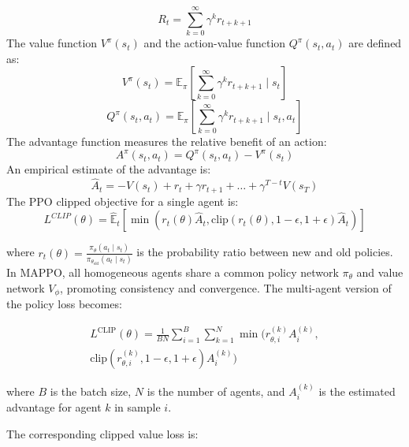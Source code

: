 \documentclass[lettersize,journal]{IEEEtran}
\begin{document}
\begin{equation}
R_t = \sum_{k=0}^{\infty} \gamma^k r_{t+k+1} \tag{10}
\end{equation}
The value function \( V^\pi(s_t) \) and the action-value function \( Q^\pi(s_t, a_t) \) are defined as:
\begin{equation}
V^\pi(s_t) = \mathbb{E}_\pi \left[ \sum_{k=0}^{\infty} \gamma^k r_{t+k+1} \mid s_t \right] \tag{11}
\end{equation}
\begin{equation}
Q^\pi(s_t, a_t) = \mathbb{E}_\pi \left[ \sum_{k=0}^{\infty} \gamma^k r_{t+k+1} \mid s_t, a_t \right] \tag{12}
\end{equation}
The advantage function measures the relative benefit of an action:
\begin{equation}
A^\pi(s_t, a_t) = Q^\pi(s_t, a_t) - V^\pi(s_t) \tag{13}
\end{equation}
An empirical estimate of the advantage is:
\begin{equation}
\hat{A}_t = -V(s_t) + r_t + \gamma r_{t+1} + \dots + \gamma^{T-t} V(s_T) \tag{14}
\end{equation}
The PPO clipped objective for a single agent is:
\begin{equation}
L^{CLIP}(\theta) = \hat{\mathbb{E}}_t \left[ \min \left( r_t(\theta) \hat{A}_t, \text{clip}(r_t(\theta), 1-\epsilon, 1+\epsilon) \hat{A}_t \right) \right] \tag{15}
\end{equation}

where \( r_t(\theta) = \frac{\pi_\theta(a_t \mid s_t)}{\pi_{\theta_{\text{old}}}(a_t \mid s_t)} \) is the probability ratio between new and old policies.
In MAPPO, all homogeneous agents share a common policy network \( \pi_\theta \) and value network \( V_\phi \), promoting consistency and convergence. The multi-agent version of the policy loss becomes:

\begin{multline}
L^{\text{CLIP}}(\theta) = \frac{1}{BN} \sum_{i=1}^{B} \sum_{k=1}^{N} 
\min \Big( r^{(k)}_{\theta,i} A^{(k)}_i, \\
\text{clip}(r^{(k)}_{\theta,i}, 1-\epsilon, 1+\epsilon) A^{(k)}_i \Big) \tag{16}
\end{multline}

where \( B \) is the batch size, \( N \) is the number of agents, and \( A^{(k)}_i \) is the estimated advantage for agent \( k \) in sample \( i \).

The corresponding clipped value loss is:
\end{document}
